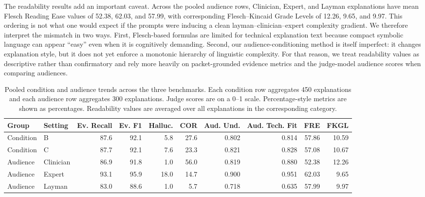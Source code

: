 \documentclass[sigconf,nonacm]{acmart}
\begin{document}
The readability results add an important caveat. Across the pooled audience rows, Clinician, Expert, and Layman explanations have mean Flesch Reading Ease values of 52.38, 62.03, and 57.99, with corresponding Flesch--Kincaid Grade Levels of 12.26, 9.65, and 9.97. This ordering is not what one would expect if the prompts were inducing a clean layman--clinician--expert complexity gradient. We therefore interpret the mismatch in two ways. First, Flesch-based formulas are limited for technical explanation text because compact symbolic language can appear ``easy'' even when it is cognitively demanding. Second, our audience-conditioning method is itself imperfect: it changes explanation style, but it does not yet enforce a monotonic hierarchy of linguistic complexity. For that reason, we treat readability values as descriptive rather than confirmatory and rely more heavily on packet-grounded evidence metrics and the judge-model audience scores when comparing audiences.

\begin{table}[t]
\caption{Pooled condition and audience trends across the three benchmarks. Each condition row aggregates 450 explanations and each audience row aggregates 300 explanations. Judge scores are on a 0--1 scale. Percentage-style metrics are shown as percentages. Readability values are averaged over all explanations in the corresponding category.}
\label{tab:pooled-trends}
\centering
\small
\begin{tabular}{llrrrrrrrr}
\toprule
\textbf{Group} & \textbf{Setting} & \textbf{Ev. Recall} & \textbf{Ev. F1} & \textbf{Halluc.} & \textbf{COR} & \textbf{Aud. Und.} & \textbf{Aud. Tech. Fit} & \textbf{FRE} & \textbf{FKGL} \\
\midrule
Condition & B & 87.6 & 92.1 & 5.8 & 27.6 & 0.802 & 0.814 & 57.86 & 10.59 \\
Condition & C & 87.7 & 92.1 & 7.6 & 23.3 & 0.821 & 0.828 & 57.08 & 10.67 \\
\midrule
Audience & Clinician & 86.9 & 91.8 & 1.0 & 56.0 & 0.819 & 0.880 & 52.38 & 12.26 \\
Audience & Expert & 93.1 & 95.9 & 18.0 & 14.7 & 0.900 & 0.951 & 62.03 & 9.65 \\
Audience & Layman & 83.0 & 88.6 & 1.0 & 5.7 & 0.718 & 0.635 & 57.99 & 9.97 \\
\bottomrule
\end{tabular}
\end{table}
\end{document}
